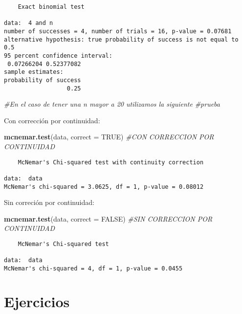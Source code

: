 \documentclass[
  a4paper,
  oneside,
  openany]{book}
\newenvironment{Shaded}{\begin{snugshade}}{\end{snugshade}}
\newcommand{\CommentTok}[1]{\textcolor[rgb]{0.56,0.35,0.01}{\textit{#1}}}
\newcommand{\DataTypeTok}[1]{\textcolor[rgb]{0.13,0.29,0.53}{#1}}
\newcommand{\KeywordTok}[1]{\textcolor[rgb]{0.13,0.29,0.53}{\textbf{#1}}}
\newcommand{\NormalTok}[1]{#1}
\newcommand{\OtherTok}[1]{\textcolor[rgb]{0.56,0.35,0.01}{#1}}
\begin{document}
\begin{verbatim}
    Exact binomial test

data:  4 and n
number of successes = 4, number of trials = 16, p-value = 0.07681
alternative hypothesis: true probability of success is not equal to 0.5
95 percent confidence interval:
 0.07266204 0.52377082
sample estimates:
probability of success 
                  0.25 
\end{verbatim}

\begin{Shaded}
\begin{Highlighting}[]
\CommentTok{\#En el caso de tener una n mayor a 20 utilizamos la siguiente}
\CommentTok{\#prueba}
\end{Highlighting}
\end{Shaded}

Con corrección por continuidad:

\begin{Shaded}
\begin{Highlighting}[]
\KeywordTok{mcnemar.test}\NormalTok{(data, }\DataTypeTok{correct =} \OtherTok{TRUE}\NormalTok{) }\CommentTok{\#CON CORRECCION POR CONTINUIDAD}
\end{Highlighting}
\end{Shaded}

\begin{verbatim}
    McNemar's Chi-squared test with continuity correction

data:  data
McNemar's chi-squared = 3.0625, df = 1, p-value = 0.08012
\end{verbatim}

Sin correción por continuidad:

\begin{Shaded}
\begin{Highlighting}[]
\KeywordTok{mcnemar.test}\NormalTok{(data, }\DataTypeTok{correct =} \OtherTok{FALSE}\NormalTok{) }\CommentTok{\#SIN CORRECCION POR CONTINUIDAD}
\end{Highlighting}
\end{Shaded}

\begin{verbatim}
    McNemar's Chi-squared test

data:  data
McNemar's chi-squared = 4, df = 1, p-value = 0.0455
\end{verbatim}

\hypertarget{ejercicios-2}{%
\section{Ejercicios}\label{ejercicios-2}}
\end{document}
